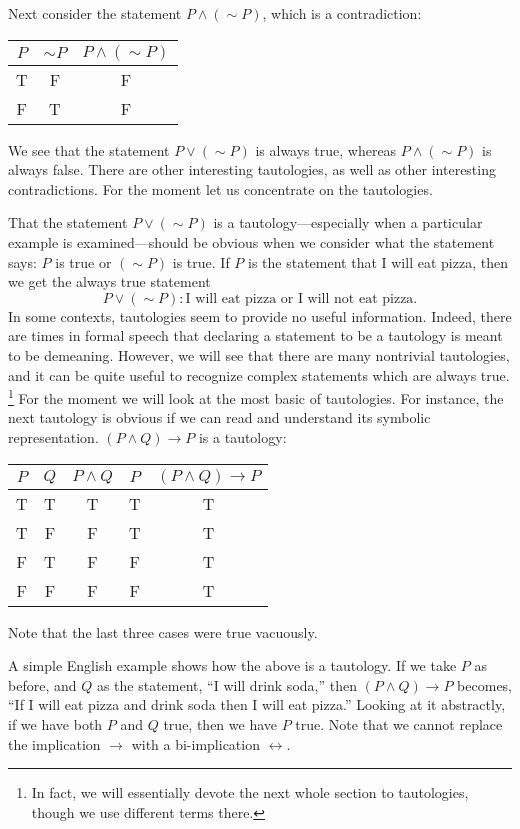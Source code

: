 \bex  Next consider the statement $P\wedge(\sim P)$,
which is a contradiction:
\begin{center}
{\rm
\begin{tabular}{|c||c|c|}
\hline
$P$ &$\sim P$& $P\wedge(\sim P)$ \\
\hline
T&F&F\\ F&T&F\\
\hline\end{tabular}
}\end{center}
\eex 
We see that the statement $P\vee(\sim P)$ is always true,
whereas $P\wedge(\sim P)$ is always false. There are
other interesting tautologies, as well as other
interesting contradictions. For the moment let us concentrate on 
the tautologies.


That the statement $P\vee(\sim P)$ is a tautology---especially
when a particular example is examined---should be obvious
when we consider what the statement says: $P$ is true or $(\sim P)$
is true. If $P$ is the statement that I will eat pizza, then we
get the always true statement
$$P\vee(\sim P): \text{I will eat pizza or I will not eat pizza.}$$
In some contexts, tautologies seem to provide 
no useful information.  Indeed, there are times in formal speech that
declaring a statement to be a tautology is meant to be demeaning.
However, we will see that there are many nontrivial tautologies,
and it can be quite useful to recognize complex statements which are
always true.%
\footnote{In fact, we will essentially  devote the next whole section
to tautologies, though we use different terms there.}
For the moment we will look at the most basic of tautologies.
For instance, the next tautology is
obvious if we can read and understand its symbolic representation.
\bex $(P\wedge Q)\longrightarrow P$ is a tautology:
\medskip
\begin{center}
{\rm
\begin{tabular}{|c|c||c|c|c|}
\hline
$P$&$Q$&$P\wedge Q$&$P$&$(P\wedge Q)\longrightarrow P$\\
\hline
T&T&T&T&T\\
T&F&F&T&T\\
F&T&F&F&T\\
F&F&F&F&T\\ \hline\end{tabular}
}\end{center}
\medskip

\noindent
Note that the last three cases were true vacuously.
\eex

A simple English example shows how the above is a tautology.  
If we take $P$ as before, and $Q$ as the statement, ``I will
drink soda,'' then $(P\wedge Q)\longrightarrow P$
becomes, ``If I will eat pizza and drink soda then I will eat pizza.''
Looking at it abstractly, if we have both $P$ and $Q$ true, then
we have $P$ true.  Note that we cannot replace the implication
$\longrightarrow$ with a bi-implication $\longleftrightarrow$.


